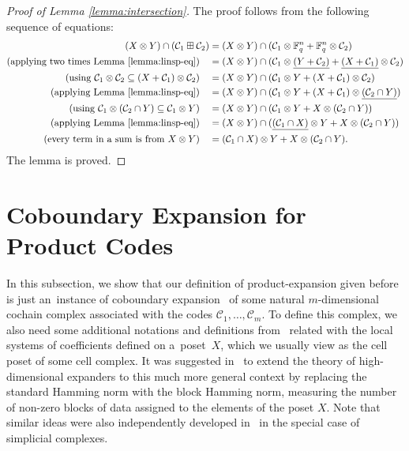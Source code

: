 \documentclass[11pt]{article}
\theoremstyle{plain}
\theoremstyle{definition}
\theoremstyle{remark}
\newcommand{\cC}{\mathcal{C}}
\newcommand{\F}{\mathbb{F}}
\begin{document}
\begin{proof}[Proof of Lemma \ref{lemma:intersection}]
    The proof follows from the following sequence of equations: 
    \begin{align*}
        (X\otimes Y)\cap (\cC_1\boxplus \cC_2)&=(X\otimes Y)\cap (\cC_1\otimes \F_q^n+\F_q^n\otimes \cC_2)\\
        (\mbox{applying two times Lemma~\ref{lemma:linsp-eq}})\quad &=(X\otimes Y)\cap (\cC_1\otimes \underline{(Y+\cC_2)}+\underline{(X+\cC_1)}\otimes \cC_2)\\
        (\mbox{using }\cC_1\otimes \cC_2\subseteq (X+\cC_1)\otimes \cC_2)\quad &=(X\otimes Y)\cap (\cC_1\otimes Y+(X+\cC_1)\otimes \cC_2)\\
        (\mbox{applying Lemma~\ref{lemma:linsp-eq}})\quad &=(X\otimes Y)\cap (\cC_1\otimes Y+(X+\cC_1)\otimes \underline{(\cC_2\cap Y)})\\
        (\mbox{using }\cC_1\otimes (\cC_2\cap Y)\subseteq \cC_1\otimes Y)\quad &=(X\otimes Y)\cap (\cC_1\otimes Y+X\otimes (\cC_2\cap Y))\\
        (\mbox{applying Lemma~\ref{lemma:linsp-eq}})\quad &=(X\otimes Y)\cap (\underline{(\cC_1\cap X)}\otimes Y+X\otimes (\cC_2\cap Y))\\
        (\mbox{every term in a sum is from }X\otimes Y)\quad &= (\cC_1\cap X)\otimes Y+X\otimes (\cC_2\cap Y).
    \end{align*}
    The lemma is proved. \qedhere
\end{proof}

\section{Coboundary Expansion for Product Codes}\label{sc:chain}

In this subsection, we show that our definition of product-expansion given before is just an~instance of coboundary expansion~\cite{Linial:2006,Gromov:2010} of some natural $m$-dimensional cochain complex associated with the codes $\cC_1,\dots,\cC_m$. To define this complex, we also need some additional notations and definitions from~\cite{Panteleev&Kalachev:stoc2022} related with the local systems of coefficients defined on a~poset~$X$, which we usually view as the cell poset of some cell complex. It was suggested in~\cite{Panteleev&Kalachev:stoc2022} to extend the theory of high-dimensional expanders to this much more general context by replacing the standard Hamming norm with the block Hamming norm, measuring the number of non-zero blocks of data assigned to the elements of the poset $X$. Note that similar ideas were also independently developed in~\cite{firstGoodQueryLocally2023} in the special case of simplicial complexes.
\end{document}
